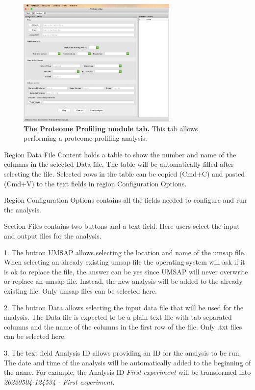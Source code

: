 \begin{figure}[h]
    \centering
    \includegraphics[width=0.7\textwidth]{./IMAGES/MOD-PROTPROF/protprof-mod.jpg}
    \caption[The Proteome Profiling module tab]{\textbf{The Proteome Profiling module
    tab.} This tab allows performing a proteome profiling analysis.}
    \label{fig:protprofTab}
    \vspace{-5pt}
\end{figure}

Region Data File Content holds a table to show the number and name of the columns in
the selected Data file. The table will be automatically filled after selecting the
file. Selected rows in the table can be copied (Cmd+C) and pasted (Cmd+V) to the
text fields in region Configuration Options.

Region Configuration Options contains all the fields needed to configure and
run the analysis.

Section Files contains two buttons and a text field. Here users select the input
and output files for the analysis.

\num{1}. The button UMSAP allows selecting the location
and name of the umsap file. When selecting an already existing umsap file the operating
system will ask if it is ok to replace the file, the answer can be yes since UMSAP
will never overwrite or replace an umsap file. Instead, the new analysis will be
added to the already existing file. Only umsap files can be selected here.

\num{2}. The button Data allows selecting the input
data file that will be used for the analysis. The Data file is expected to be a
plain text file with tab separated columns and the name of the columns in the first
row of the file. Only .txt files can be selected here.

\num{3}. The text field Analysis ID allows providing an ID for the analysis
to be run. The date and time of the analysis will be automatically added to the
beginning of the name. For example, the Analysis ID \textit{First experiment} will
be transformed into \textit{20220504-124534 - First experiment}.

